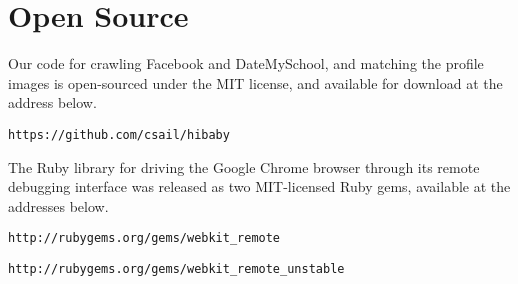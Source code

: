 \section{Open Source}

Our code for crawling Facebook and DateMySchool, and matching the profile
images is open-sourced under the MIT license, and available for download at the
address below.

\texttt{https://github.com/csail/hibaby}

The Ruby library for driving the Google Chrome browser through its remote
debugging interface was released as two MIT-licensed Ruby gems, available at
the addresses below.

\texttt{http://rubygems.org/gems/webkit_remote}

\texttt{http://rubygems.org/gems/webkit_remote_unstable}
